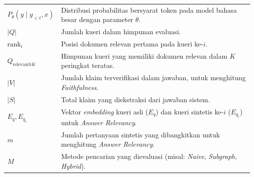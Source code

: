 \begin{longtable}{p{} p{}}
    $P_\theta(y \mid y_{<t}, x)$            & Distribusi probabilitas bersyarat token pada model bahasa besar dengan parameter $\theta$.                          \\

    $|Q|$                                   & Jumlah kueri dalam himpunan evaluasi.                                                                               \\
    $\text{rank}_i$                         & Posisi dokumen relevan pertama pada kueri ke-$i$.                                                                   \\
    $Q_{\text{relevan@}K}$                  & Himpunan kueri yang memiliki dokumen relevan dalam $K$ peringkat teratas.                                           \\
    $|V|$                                   & Jumlah klaim terverifikasi dalam jawaban, untuk menghitung \textit{Faithfulness}.                                   \\
    $|S|$                                   & Total klaim yang diekstraksi dari jawaban sistem.                                                                   \\
    $E_q, E_{q_i}$                          & Vektor \textit{embedding} kueri asli ($E_q$) dan kueri sintetis ke-$i$ ($E_{q_i}$) untuk \textit{Answer Relevancy}. \\
    $m$                                     & Jumlah pertanyaan sintetis yang dibangkitkan untuk menghitung \textit{Answer Relevancy}.                            \\
    $M$                                     & Metode pencarian yang dievaluasi (misal: \textit{Naive}, \textit{Subgraph}, \textit{Hybrid}).                       \\
\end{longtable}
